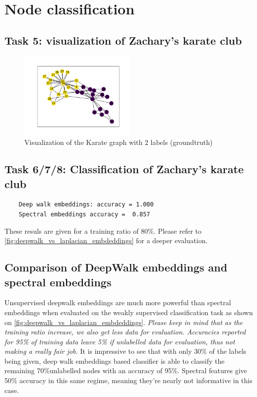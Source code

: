 \documentclass[a4paper]{article}
\begin{document}
\break

\section{Node classification}
\subsection*{Task 5: visualization of Zachary's karate club}

\begin{figure}[ht]
    \centering
    \includegraphics[width=0.5\textwidth]{figures/labeled_karate_graph.png}
    \caption{Visualization of the Karate graph with 2 labels (groundtruth)}
    \label{fig:karate_labeled}
\end{figure}

\subsection*{Task 6/7/8: Classification of Zachary's karate club}
\begin{verbatim}
    Deep walk embeddings: accuracy = 1.000
    Spectral embeddings accuracy =  0.857
\end{verbatim}
These resuls are given for a training ratio of 80\%. Please refer to \ref{fig:deepwalk_vs_laplacian_embdeddings}
for a deeper evaluation.

\subsection*{Comparison of DeepWalk embeddings and spectral embeddings}
Unsupervised deepwalk embeddings are much more powerful than spectral embeddings when evaluated on
the weakly supervised classification task as shown on \ref{fig:deepwalk_vs_laplacian_embdeddings}.
\textit{Please keep in mind that as the training ratio increase, we also get less data for evaluation.
Accuracies reported for 95\% of training data leave 5\% if unlabelled data for evaluation,
thus not making a really fair job.} It is impressive to see that with only 30\% of the labels being given, deep walk
embeddings based classifier is able to classify the remaining 70\%unlabelled nodes with an accuracy of 95\%.
Spectral features give 50\% accuracy in this same regime, meaning they're nearly not informative in this case.
\end{document}
